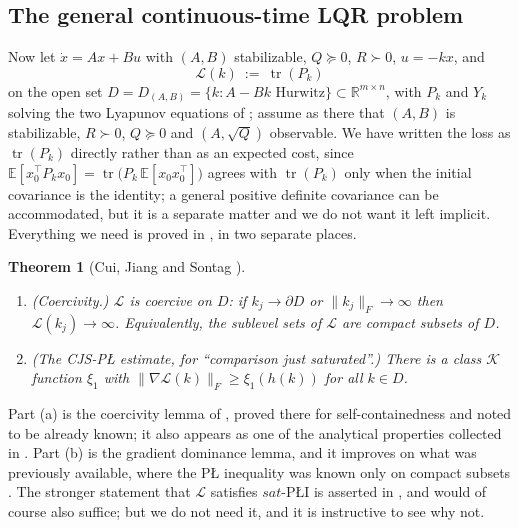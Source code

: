 \documentclass[11pt]{article}
\theoremstyle{plain}
\newtheorem{thm}{Theorem}[section]
\theoremstyle{definition}
\theoremstyle{remark}
\newcommand{\R}{\mathbb{R}}
\begin{document}
\subsection{The general continuous-time LQR problem}

Now let $\dot x = Ax+Bu$ with $(A,B)$ stabilizable, $Q\succeq0$, $R\succ0$,
$u=-kx$, and
\[
  \mathcal{L}(k) \ :=\ \operatorname{tr}(P_k)
\]
on the open set $D = D_{(A,B)} = \{k : A-Bk \text{ Hurwitz}\}\subset\R^{m\times n}$,
with $P_k$ and $Y_k$ solving the two Lyapunov equations of
\cite[\S2]{Sontag2025L4DC}; assume as there that $(A,B)$ is stabilizable, $R\succ0$,
$Q\succeq0$ and $(A,\sqrt Q)$ observable. We have written the loss as
$\operatorname{tr}(P_k)$ directly rather than as an expected cost, since
$\mathbb{E}[x_0^\top P_k x_0] = \operatorname{tr}\bigl(P_k\,\mathbb{E}[x_0x_0^\top]\bigr)$
agrees with $\operatorname{tr}(P_k)$ only when the initial covariance is the
identity; a general positive definite covariance can be accommodated, but it is a
separate matter and we do not want it left implicit. Everything we need is proved
in \cite{CuiJiangSontag2024}, in two separate places.

\begin{thm}[Cui, Jiang and Sontag \cite{CuiJiangSontag2024}]\label{thm:cjs}
\phantom{.}
\begin{enumerate}
\item[(a)] \emph{(Coercivity.)} $\mathcal{L}$ is coercive on $D$: if $k_j\to\partial D$
or $\|k_j\|_F\to\infty$ then $\mathcal{L}(k_j)\to\infty$. Equivalently, the
sublevel sets of $\mathcal{L}$ are compact subsets of $D$.
\item[(b)] \emph{(The CJS-P\L{} estimate, for ``comparison just saturated''.)}
There is a class $\mathcal{K}$ function
$\xi_1$ with $\|\nabla\mathcal{L}(k)\|_F \ge \xi_1(h(k))$ for all $k\in D$.
\end{enumerate}
\end{thm}

Part (a) is the coercivity lemma of \cite{CuiJiangSontag2024}, proved there for
self-containedness and noted to be already known; it also appears as one of the
analytical properties collected in \cite[\S3.4]{BuMesbahi2020}. Part (b) is the
gradient dominance lemma, and it improves on what was previously available, where
the P\L{} inequality was known only on compact subsets
\cite{BuMesbahi2020, Mohammadi2022}. The stronger statement that $\mathcal{L}$
satisfies $sat$-P\L{}I is asserted in \cite{Sontag2025L4DC}, and would of course
also suffice; but we do not need it, and it is instructive to see why not.
\end{document}
